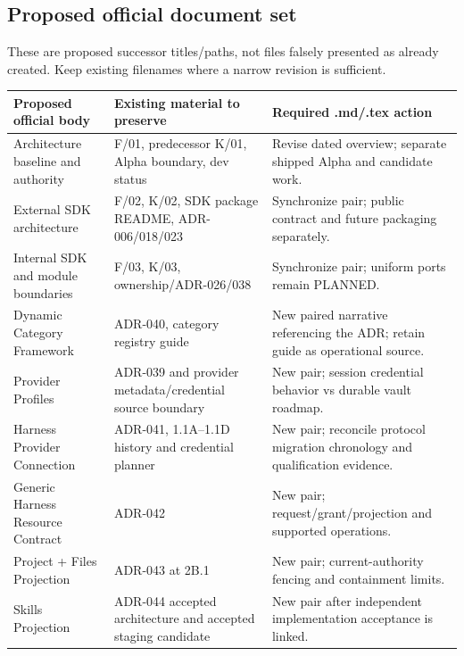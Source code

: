 \documentclass[
  11pt,
]{article}
\begin{document}
\hypertarget{proposed-official-document-set}{%
\subsection{Proposed official document
set}\label{proposed-official-document-set}}

These are proposed successor titles/paths, not files falsely presented
as already created. Keep existing filenames where a narrow revision is
sufficient.

\begin{longtable}[]{@{}>{\raggedright\arraybackslash}p{}>{\raggedright\arraybackslash}p{}>{\raggedright\arraybackslash}p{}@{}}
\toprule\noalign{}
Proposed official body & Existing material to preserve & Required
.md/.tex action \\
\midrule\noalign{}
\endhead
\bottomrule\noalign{}
\endlastfoot
Architecture baseline and authority & F/01, predecessor K/01, Alpha
boundary, dev status & Revise dated overview; separate shipped Alpha and
candidate work. \\
External SDK architecture & F/02, K/02, SDK package README,
ADR-006/018/023 & Synchronize pair; public contract and future packaging
separately. \\
Internal SDK and module boundaries & F/03, K/03, ownership/ADR-026/038 &
Synchronize pair; uniform ports remain PLANNED. \\
Dynamic Category Framework & ADR-040, category registry guide & New
paired narrative referencing the ADR; retain guide as operational
source. \\
Provider Profiles & ADR-039 and provider metadata/credential source
boundary & New pair; session credential behavior vs durable vault
roadmap. \\
Harness Provider Connection & ADR-041, 1.1A--1.1D history and credential
planner & New pair; reconcile protocol migration chronology and
qualification evidence. \\
Generic Harness Resource Contract & ADR-042 & New pair;
request/grant/projection and supported operations. \\
Project + Files Projection & ADR-043 at 2B.1 & New pair;
current-authority fencing and containment limits. \\
Skills Projection & ADR-044 accepted architecture and accepted staging
candidate & New pair after independent implementation acceptance is
linked. \\

\end{longtable}
\end{document}
